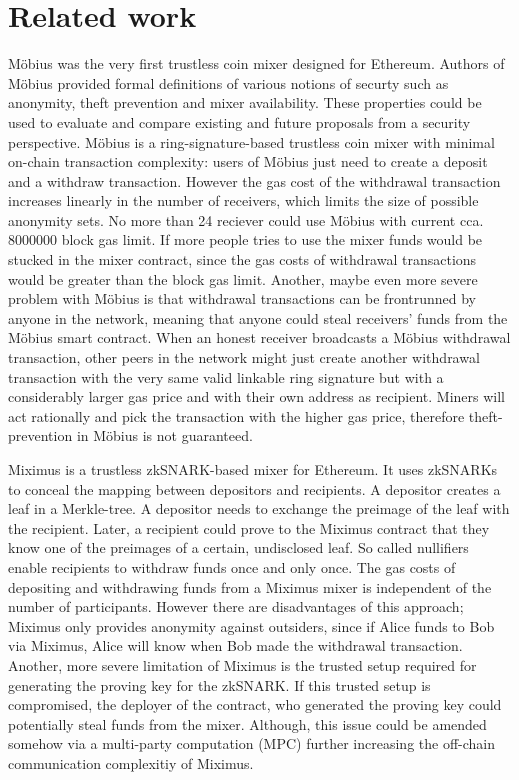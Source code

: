 \documentclass[a4paper]{article}
\theoremstyle{definition}
\begin{document}
\section{Related work}
Möbius was the very first trustless coin mixer designed for Ethereum\cite{meiklejohn2018mobius}. Authors of Möbius provided formal definitions of various notions of securty such as anonymity, theft prevention and mixer availability. These properties could be used to evaluate and compare existing and future proposals from a security perspective. Möbius is a ring-signature-based trustless coin mixer with minimal on-chain transaction complexity: users of Möbius just need to create a deposit and a withdraw transaction. However the gas cost of the withdrawal transaction increases linearly in the number of receivers, which limits the size of possible anonymity sets. No more than 24 reciever could use Möbius with current cca.$\num[group-separator={,}]{8000000}$  block gas limit. If more people tries to use the mixer funds would be stucked in the mixer contract, since the gas costs of withdrawal transactions would be greater than the block gas limit. Another, maybe even more severe problem with Möbius is that withdrawal transactions can be frontrunned by anyone in the network, meaning that anyone could steal receivers' funds from the Möbius smart contract. When an honest receiver broadcasts a Möbius withdrawal transaction, other peers in the network might just create another withdrawal transaction with the very same valid linkable ring signature but with a considerably larger gas price and with their own address as recipient. Miners will act rationally and pick the transaction with the higher gas price, therefore theft-prevention in Möbius is not guaranteed.     


Miximus is a trustless zkSNARK-based mixer for Ethereum\cite{miximus2018}. It uses zkSNARKs to conceal the mapping between depositors and recipients. A depositor creates a leaf in a Merkle-tree. A depositor needs to exchange the preimage of the leaf with the recipient. Later, a recipient could prove to the Miximus contract that they know one of the preimages of a certain, undisclosed leaf. So called nullifiers enable recipients to withdraw funds once and only once. The gas costs of depositing and withdrawing funds from a Miximus mixer is independent of the number of participants. However there are disadvantages of this approach; Miximus only provides anonymity against outsiders, since if Alice funds to Bob via Miximus, Alice will know when Bob made the withdrawal transaction. Another, more severe limitation of Miximus is the trusted setup required for generating the proving key for the zkSNARK. If this trusted setup is compromised, the deployer of the contract, who generated the proving key could potentially steal funds from the mixer. Although, this issue could be amended somehow via a multi-party computation (MPC) further increasing the off-chain communication complexitiy of Miximus.
\end{document}
